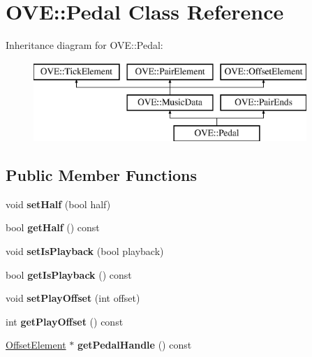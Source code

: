 \hypertarget{class_o_v_e_1_1_pedal}{}\section{O\+VE\+:\+:Pedal Class Reference}
\label{class_o_v_e_1_1_pedal}
Inheritance diagram for O\+VE\+:\+:Pedal\+:\begin{figure}[H]
\begin{center}
\leavevmode
\includegraphics[height=3.000000cm]{class_o_v_e_1_1_pedal}
\end{center}
\end{figure}
\subsection*{Public Member Functions}
\begin{DoxyCompactItemize}
\item 
\mbox{\label{class_o_v_e_1_1_pedal_ace0a563ead2080dc3816645e8e39b9d4}} 
void {\bfseries set\+Half} (bool half)
\item 
\mbox{\label{class_o_v_e_1_1_pedal_aaca1bd9bccc0392012fc87ce337f805a}} 
bool {\bfseries get\+Half} () const
\item 
\mbox{\label{class_o_v_e_1_1_pedal_a267fa7bf40ffc397cbb94c743223d063}} 
void {\bfseries set\+Is\+Playback} (bool playback)
\item 
\mbox{\label{class_o_v_e_1_1_pedal_a1ce0cae0a69db022831e66b49c73757a}} 
bool {\bfseries get\+Is\+Playback} () const
\item 
\mbox{\label{class_o_v_e_1_1_pedal_ab8f2d397d64340386f4e104d37b76f4a}} 
void {\bfseries set\+Play\+Offset} (int offset)
\item 
\mbox{\label{class_o_v_e_1_1_pedal_a56b11899a2d8962c9a12a4b895a42bb4}} 
int {\bfseries get\+Play\+Offset} () const
\item 
\mbox{\label{class_o_v_e_1_1_pedal_aae41083ee55579970fd702c1a7887820}} 
\hyperlink{class_o_v_e_1_1_offset_element}{Offset\+Element} $\ast$ {\bfseries get\+Pedal\+Handle} () const
\end{DoxyCompactItemize}
